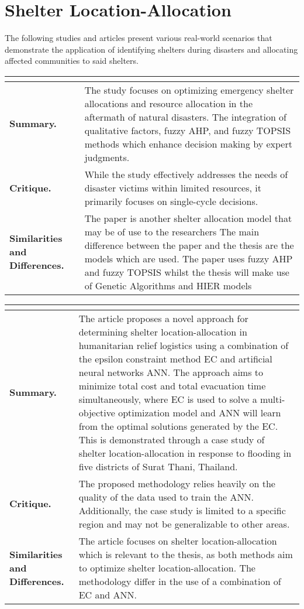\section{Shelter Location-Allocation}

The following studies and articles present various real-world scenarios that demonstrate the application of identifying shelters during disasters and allocating affected communities to said shelters. 

\begin{longtable}{|L{.2\linewidth}|L{.74\linewidth}|}
	\hline
	\\ \hline
	\textbf{Summary.} & The study focuses on optimizing emergency shelter allocations and resource allocation in the aftermath of natural disasters. The integration of qualitative factors, fuzzy AHP, and fuzzy TOPSIS methods which enhance decision making by expert judgments.\\ \hline
	\textbf{Critique.} & While the study effectively addresses the needs of disaster victims within limited resources, it primarily focuses on single-cycle decisions.\\ \hline
	\textbf{Similarities and Differences.} & The paper is another shelter allocation model that may be of use to the researchers	The main difference between the paper and the thesis are the models which are used. The paper uses fuzzy AHP and fuzzy TOPSIS whilst the thesis will make use of Genetic Algorithms and HIER models \\ \hline
\end{longtable}

\begin{longtable}{|L{.2\linewidth}|L{.74\linewidth}|}
	\hline
	\\ \hline
	\textbf{Summary.} & The article proposes a novel approach for determining shelter location-allocation in humanitarian relief logistics using a combination of the epsilon constraint method EC and artificial neural networks ANN. The approach aims to minimize total cost and total evacuation time simultaneously, where EC is used  to solve a multi-objective optimization model and ANN will learn from the optimal solutions generated by the EC. This is demonstrated through a case study of shelter location-allocation in response to flooding in five districts of Surat Thani, Thailand.\\ \hline
	\textbf{Critique.} & The proposed methodology relies heavily on the quality of the data used to train the ANN. Additionally, the case study is limited to a specific region and may not be generalizable to other areas.\\ \hline
	\textbf{Similarities and Differences.} & The article focuses on shelter location-allocation which is relevant to the thesis, as both methods aim to optimize shelter location-allocation.	The methodology differ in the use of a combination of EC and ANN. \\ \hline
\end{longtable}

